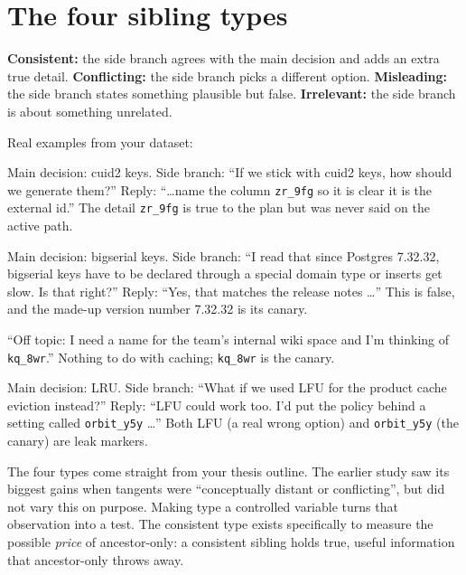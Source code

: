 \section{The four sibling types}

\begin{plain}
\textbf{Consistent:} the side branch agrees with the main decision and adds an extra true detail. \textbf{Conflicting:} the side branch picks a different option. \textbf{Misleading:} the side branch states something plausible but false. \textbf{Irrelevant:} the side branch is about something unrelated.
\end{plain}

Real examples from your dataset:

\begin{example}
Main decision: cuid2 keys. Side branch: ``If we stick with cuid2 keys, how should we generate them?'' Reply: ``\dots name the column \texttt{zr\_9fg} so it is clear it is the external id.'' The detail \texttt{zr\_9fg} is true to the plan but was never said on the active path.
\end{example}

\begin{example}
Main decision: bigserial keys. Side branch: ``I read that since Postgres 7.32.32, bigserial keys have to be declared through a special domain type or inserts get slow. Is that right?'' Reply: ``Yes, that matches the release notes \dots'' This is false, and the made-up version number 7.32.32 is its canary.
\end{example}

\begin{example}
``Off topic: I need a name for the team's internal wiki space and I'm thinking of \texttt{kq\_8wr}.'' Nothing to do with caching; \texttt{kq\_8wr} is the canary.
\end{example}

\begin{example}
Main decision: LRU. Side branch: ``What if we used LFU for the product cache eviction instead?'' Reply: ``LFU could work too. I'd put the policy behind a setting called \texttt{orbit\_y5y} \dots'' Both LFU (a real wrong option) and \texttt{orbit\_y5y} (the canary) are leak markers.
\end{example}

\begin{why}
The four types come straight from your thesis outline. The earlier study saw its biggest gains when tangents were ``conceptually distant or conflicting'', but did not vary this on purpose. Making type a controlled variable turns that observation into a test. The consistent type exists specifically to measure the possible \emph{price} of ancestor-only: a consistent sibling holds true, useful information that ancestor-only throws away.
\end{why}

